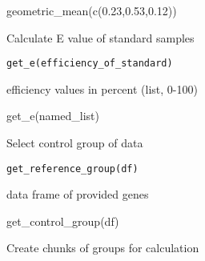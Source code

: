 \documentclass[letterpaper]{book}
\begin{document}
%
\begin{Examples}
\begin{ExampleCode}
geometric_mean(c(0.23,0.53,0.12))
\end{ExampleCode}
\end{Examples}
%
\begin{Description}\relax
Calculate E value of standard samples
\end{Description}
%
\begin{Usage}
\begin{verbatim}
get_e(efficiency_of_standard)
\end{verbatim}
\end{Usage}
%
\begin{Arguments}
\begin{ldescription}
\item[\code{efficiency\_of\_standard}] efficiency values in percent (list, 0-100)
\end{ldescription}
\end{Arguments}
%
\begin{Examples}
\begin{ExampleCode}
get_e(named_list)
\end{ExampleCode}
\end{Examples}
%
\begin{Description}\relax
Select control group of data
\end{Description}
%
\begin{Usage}
\begin{verbatim}
get_reference_group(df)
\end{verbatim}
\end{Usage}
%
\begin{Arguments}
\begin{ldescription}
\item[\code{df}] data frame of provided genes
\end{ldescription}
\end{Arguments}
%
\begin{Examples}
\begin{ExampleCode}
get_control_group(df)
\end{ExampleCode}
\end{Examples}
%
\begin{Description}\relax
Create chunks of groups for calculation
\end{Description}
\end{document}
